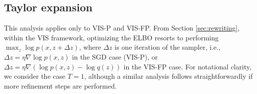 \subsection{Taylor expansion}\label{sec:taylor}

This analysis applies only to VIS-P and VIS-FP.
From Section \ref{sec:rewriting},  within the VIS framework, optimizing the ELBO resorts to performing $\max_z \log p(x, z + \Delta z)$, where $\Delta z$ is one iteration of the sampler, i.e., $\Delta z = \eta \nabla \log p(x, z)$ in the SGD case (VIS-P), or $\Delta z = \eta \nabla (\log p(x, z) - \log q(z))$ in the VIS-FP case. %
For notational clarity, we consider the case $T=1$, 
although a similar analysis
follows straightforwardly if more refinement steps are performed.

